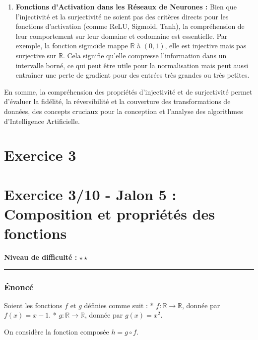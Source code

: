 \documentclass[12pt,a4paper]{report}
\begin{document}
\begin{enumerate}
  redondants (injectivité dans l'espace latent). Un générateur qui n'est
  pas suffisamment surjectif pourrait souffrir de ``mode collapse'', où
  il ne génère qu'une petite variété d'échantillons.
\item
  \textbf{Fonctions d'Activation dans les Réseaux de Neurones :} Bien
  que l'injectivité et la surjectivité ne soient pas des critères
  directs pour les fonctions d'activation (comme ReLU, Sigmoid, Tanh),
  la compréhension de leur comportement sur leur domaine et codomaine
  est essentielle. Par exemple, la fonction sigmoïde mappe
  \(\mathbb{R}\) à \((0,1)\), elle est injective mais pas surjective sur
  \(\mathbb{R}\). Cela signifie qu'elle compresse l'information dans un
  intervalle borné, ce qui peut être utile pour la normalisation mais
  peut aussi entraîner une perte de gradient pour des entrées très
  grandes ou très petites.
\end{enumerate}

En somme, la compréhension des propriétés d'injectivité et de
surjectivité permet d'évaluer la fidélité, la réversibilité et la
couverture des transformations de données, des concepts cruciaux pour la
conception et l'analyse des algorithmes d'Intelligence Artificielle.
\newpage
\section{Exercice 3}
\section{Exercice 3/10 - Jalon 5 : Composition et propriétés des
fonctions}\label{exercice-310---jalon-5-composition-et-propriuxe9tuxe9s-des-fonctions}

\textbf{Niveau de difficulté :} \(\star\star\)

\begin{center}\rule{0.5\linewidth}{0.5pt}\end{center}

\subsubsection{Énoncé}\label{uxe9noncuxe9}

Soient les fonctions \(f\) et \(g\) définies comme suit : *
\(f: \mathbb{R} \to \mathbb{R}\), donnée par \(f(x) = x-1\). *
\(g: \mathbb{R} \to \mathbb{R}\), donnée par \(g(x) = x^2\).

On considère la fonction composée \(h = g \circ f\).
\end{document}
